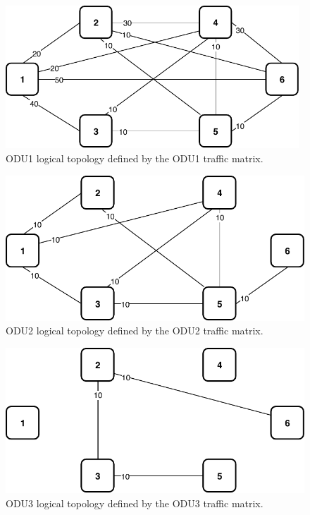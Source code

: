 \begin{figure}[h!]
\centering
\includegraphics[width=11cm]{sdf/ilp/transparent_protection/figures/logical_topology_ODU1_medium}
\caption{ODU1 logical topology defined by the ODU1 traffic matrix.}
\label{logical2_ODU1_protectionmedium}
\end{figure}

\newpage
\begin{figure}[h!]
\centering
\includegraphics[width=12cm]{sdf/ilp/transparent_protection/figures/logical_topology_ODU2_medium}
\caption{ODU2 logical topology defined by the ODU2 traffic matrix.}
\label{logical2_ODU2_protectionmedium}
\end{figure}

\begin{figure}[h!]
\centering
\includegraphics[width=12cm]{sdf/ilp/transparent_protection/figures/logical_topology_ODU3_medium}
\caption{ODU3 logical topology defined by the ODU3 traffic matrix.}
\label{logical2_ODU3_protectionmedium}
\end{figure}

